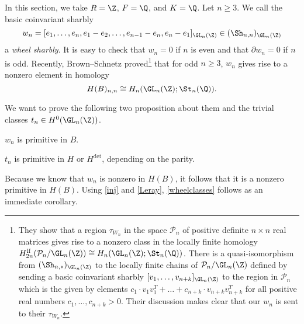 In this section, we take $R=\Z$, $F=\Q$, and $K=\Q$. 
Let $n\ge 3$. We call the basic coinvariant sharbly
\[ w_n = [e_1, \dots, e_n, e_1-e_2, \dots, e_{n-1}-e_n, e_n-e_1]_{\GL_n(\Z)} \in (\Sh_{n,n})_{\GL_n(\Z)}\]
a \emph{wheel sharbly}. It is easy to check that $w_n =0$ if $n$ is even and that $\partial w_n = 0$ if $n$ is odd. Recently, Brown--Schnetz \cite[Theorem 4(i)]{Brown24} proved\footnote{They show that a region $\tau_{W_n}$ in the space $\mathcal P_n$ of positive definite $n\times n$ real matrices gives rise to a nonzero class in the locally finite homology $H^{\mathrm{lf}}_{2n}(\mathcal P_n/\GL_n(\Z)) \cong H_n(\GL_n(\Z);\St_n(\Q))$. There is a quasi-isomorphism from $(\Sh_{n,*})_{\GL_n(\Z)}$ to the locally finite chains of $\mathcal P_n/\GL_n(\Z)$ defined by sending a basic coinvariant sharbly $[v_1,\dots, v_{n+k}]_{\GL_n(\Z)}$ to the region in $\mathcal P_n$ which is the given by elements $c_1 \cdot v_1v_1^T + \dots + c_{n+k} \cdot v_{n+k}v_{n+k}^T$ for all positive real numbers $c_1, \dots, c_{n+k}>0$. Their discussion makes clear that our $w_n$ is sent to their $\tau_{W_n}$.}
that for odd $n\ge3$, $w_n$ gives rise to a nonzero element in homology
\[ H(B)_{n,n} \cong H_n(\GL_n(\Z); \St_n(\Q)).\]

We want to prove the following two proposition about them and the trivial classes $t_n \in H^0(\GL_n(\Z))$.

\begin{proposition}\label{primitivewheels}
$w_n$ is primitive in $B$.
\end{proposition}

\begin{proposition}\label{primitivetrivial}
$t_n$ is primitive in $H$ or $H^{\det}$, depending on the parity.
\end{proposition}

Because we know that $w_n$ is nonzero in $H(B)$, it follows that it is a nonzero primitive in $H(B)$. Using \autoref{inj} and \autoref{Leray}, \autoref{wheelclasses} follows as an immediate corollary.

